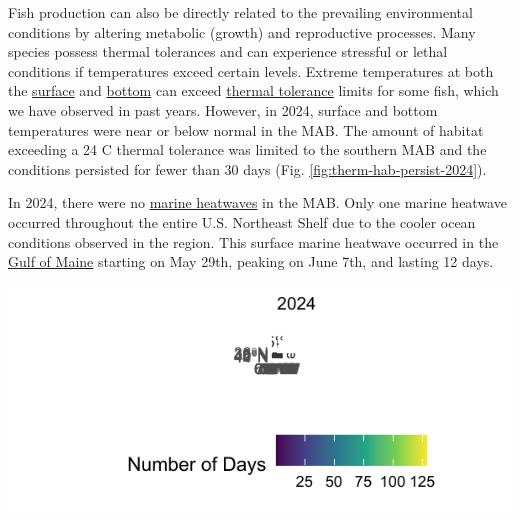 \documentclass[
  10pt,
]{article}
\let\origfigure\figure
\let\endorigfigure\endfigure
\renewenvironment{figure}[1][2] {
    \expandafter\origfigure\expandafter[H]
} {
    \endorigfigure
}
\begin{document}
Fish production can also be directly related to the prevailing environmental conditions by altering metabolic (growth) and reproductive processes. Many species possess thermal tolerances and can experience stressful or lethal conditions if temperatures exceed certain levels. Extreme temperatures at both the \href{https://noaa-edab.github.io/catalog/seasonal_oisst_anom.html}{surface} and \href{https://noaa-edab.github.io/catalog/bottom_temp_model_anom.html}{bottom} can exceed \href{https://noaa-edab.github.io/catalog/thermal_habitat_gridded.html}{thermal tolerance} limits for some fish, which we have observed in past years. However, in 2024, surface and bottom temperatures were near or below normal in the MAB. The amount of habitat exceeding a 24 C thermal tolerance was limited to the southern MAB and the conditions persisted for fewer than 30 days (Fig. \ref{fig:therm-hab-persist-2024}).

In 2024, there were no \href{https://noaa-edab.github.io/catalog/heatwave.html}{marine heatwaves} in the MAB. Only one marine heatwave occurred throughout the entire U.S. Northeast Shelf due to the cooler ocean conditions observed in the region. This surface marine heatwave occurred in the \href{https://noaa-edab.github.io/catalog/heatwave_year.html\#newengland-22}{Gulf of Maine} starting on May 29th, peaking on June 7th, and lasting 12 days.

\begin{figure}

{\centering \includegraphics{midatlantic_files/figure-latex/therm-hab-persist-2024-1} 

}

\caption{The number of days in 2024 where bottom temperature exceeds 15℃ (left) and 24℃ (right) based on the GLORYS 1/12 degree grid.}\label{fig:therm-hab-persist-2024}
\end{figure}
\end{document}
